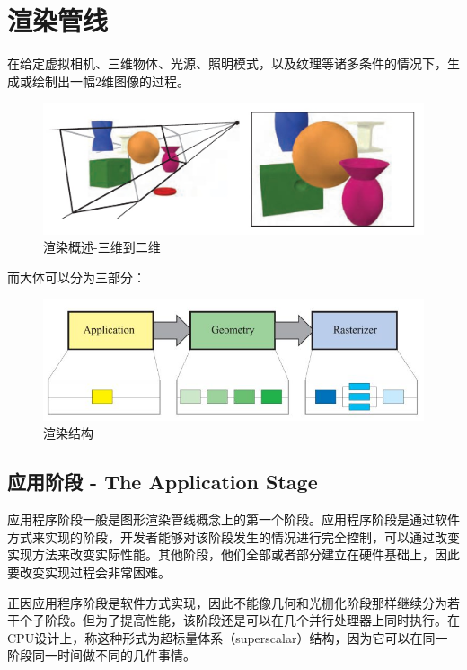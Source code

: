 \documentclass[UTF8,a4paper,12pt]{ctexbook}
\begin{document}
	
	
	
	
\chapter{渲染管线}
	在给定虚拟相机、三维物体、光源、照明模式，以及纹理等诸多条件的情况下，生成或绘制出一幅2维图像的过程。
		\begin{figure}[H]
			\centering
			\includegraphics[scale=0.5]{Outline}
			\caption{渲染概述-三维到二维}
		\end{figure}
		
		而大体可以分为三部分：
		
		\begin{figure}[H]
			\centering
			\includegraphics[scale=0.7]{Outline2}
			\caption{渲染结构}
		\end{figure}
		
	\section{应用阶段 - The Application Stage}
		应用程序阶段一般是图形渲染管线概念上的第一个阶段。应用程序阶段是通过软件方式来实现的阶段，开发者能够对该阶段发生的情况进行完全控制，可以通过改变实现方法来改变实际性能。其他阶段，他们全部或者部分建立在硬件基础上，因此要改变实现过程会非常困难。
		
		正因应用程序阶段是软件方式实现，因此不能像几何和光栅化阶段那样继续分为若干个子阶段。但为了提高性能，该阶段还是可以在几个并行处理器上同时执行。在CPU设计上，称这种形式为超标量体系（superscalar）结构，因为它可以在同一阶段同一时间做不同的几件事情。
		
\end{document}

